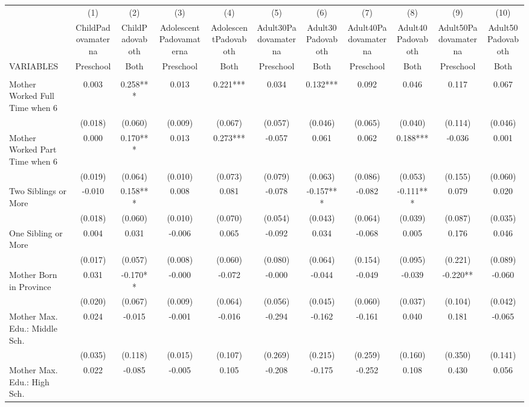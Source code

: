 \begin{tabular}{lcccccccccc} \hline
 & (1) & (2) & (3) & (4) & (5) & (6) & (7) & (8) & (9) & (10) \\
 & ChildPadovamaterna & ChildPadovaboth & AdolescentPadovamaterna & AdolescentPadovaboth & Adult30Padovamaterna & Adult30Padovaboth & Adult40Padovamaterna & Adult40Padovaboth & Adult50Padovamaterna & Adult50Padovaboth \\
VARIABLES & Preschool & Both & Preschool & Both & Preschool & Both & Preschool & Both & Preschool & Both \\ \hline
 &  &  &  &  &  &  &  &  &  &  \\
Mother Worked Full Time when 6 & 0.003 & 0.258*** & 0.013 & 0.221*** & 0.034 & 0.132*** & 0.092 & 0.046 & 0.117 & 0.067 \\
 & (0.018) & (0.060) & (0.009) & (0.067) & (0.057) & (0.046) & (0.065) & (0.040) & (0.114) & (0.046) \\
Mother Worked Part Time when 6 & 0.000 & 0.170*** & 0.013 & 0.273*** & -0.057 & 0.061 & 0.062 & 0.188*** & -0.036 & 0.001 \\
 & (0.019) & (0.064) & (0.010) & (0.073) & (0.079) & (0.063) & (0.086) & (0.053) & (0.155) & (0.060) \\
Two Siblings or More & -0.010 & 0.158*** & 0.008 & 0.081 & -0.078 & -0.157*** & -0.082 & -0.111*** & 0.079 & 0.020 \\
 & (0.018) & (0.060) & (0.010) & (0.070) & (0.054) & (0.043) & (0.064) & (0.039) & (0.087) & (0.035) \\
One Sibling or More & 0.004 & 0.031 & -0.006 & 0.065 & -0.092 & 0.034 & -0.068 & 0.005 & 0.176 & 0.046 \\
 & (0.017) & (0.057) & (0.008) & (0.060) & (0.080) & (0.064) & (0.154) & (0.095) & (0.221) & (0.089) \\
Mother Born in Province & 0.031 & -0.170** & -0.000 & -0.072 & -0.000 & -0.044 & -0.049 & -0.039 & -0.220** & -0.060 \\
 & (0.020) & (0.067) & (0.009) & (0.064) & (0.056) & (0.045) & (0.060) & (0.037) & (0.104) & (0.042) \\
Mother Max. Edu.: Middle Sch. & 0.024 & -0.015 & -0.001 & -0.016 & -0.294 & -0.162 & -0.161 & 0.040 & 0.181 & -0.065 \\
 & (0.035) & (0.118) & (0.015) & (0.107) & (0.269) & (0.215) & (0.259) & (0.160) & (0.350) & (0.141) \\
Mother Max. Edu.: High Sch. & 0.022 & -0.085 & -0.005 & 0.105 & -0.208 & -0.175 & -0.252 & 0.108 & 0.430 & 0.056 \\

\end{tabular}
